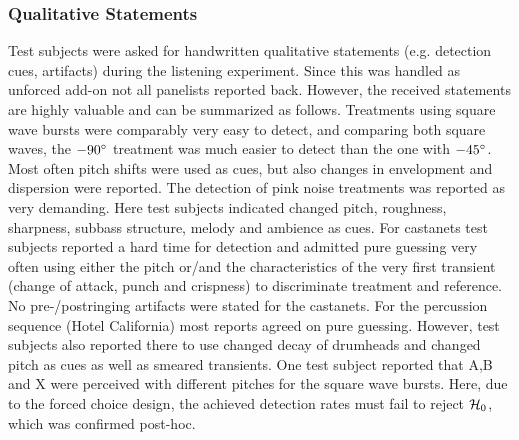 \subsubsection{Qualitative Statements}
Test subjects were asked for handwritten qualitative statements (e.g. detection cues,
artifacts) during the listening experiment.
%
Since this was handled as unforced add-on not all panelists reported back.
%
However, the received statements are highly valuable and can be summarized as follows.
%
\NewL Treatments using square wave bursts were comparably very easy to detect, and
comparing both square waves, the $-90\degree$ treatment was much easier to detect than the
one with $-45\degree$.
%
Most often pitch shifts were used as cues, but also changes in envelopment and
dispersion were reported.
%
\NewL The detection of pink noise treatments was reported as very demanding.
%
Here test subjects indicated changed pitch, roughness, sharpness, subbass
structure, melody and ambience as cues.
%
For castanets test subjects reported a hard time for detection and admitted
pure guessing very often
using either the pitch or/and the characteristics of the very first transient
(change of attack, punch and crispness)
to discriminate treatment and reference.
%
No pre-/postringing artifacts were stated for the castanets.
%
%
\NewL For the percussion sequence (Hotel California) most reports agreed on pure guessing.
%
However, test subjects also reported there to use changed decay of drumheads and
changed pitch as cues as well as smeared transients.
%
\NewL One test subject reported that A,B and X were perceived with different pitches
for the square wave bursts.
%
Here, due to the forced choice design, the achieved detection rates
must fail to reject $\mathcal{H}_{0}$, which was confirmed post-hoc.
